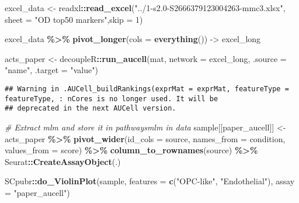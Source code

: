 \documentclass[
]{article}
\newenvironment{Shaded}{\begin{snugshade}}{\end{snugshade}}
\newcommand{\AttributeTok}[1]{\textcolor[rgb]{0.13,0.29,0.53}{#1}}
\newcommand{\CommentTok}[1]{\textcolor[rgb]{0.56,0.35,0.01}{\textit{#1}}}
\newcommand{\DecValTok}[1]{\textcolor[rgb]{0.00,0.00,0.81}{#1}}
\newcommand{\FunctionTok}[1]{\textcolor[rgb]{0.13,0.29,0.53}{\textbf{#1}}}
\newcommand{\NormalTok}[1]{#1}
\newcommand{\OtherTok}[1]{\textcolor[rgb]{0.56,0.35,0.01}{#1}}
\newcommand{\SpecialCharTok}[1]{\textcolor[rgb]{0.81,0.36,0.00}{\textbf{#1}}}
\newcommand{\StringTok}[1]{\textcolor[rgb]{0.31,0.60,0.02}{#1}}
\begin{document}
\begin{Shaded}
\begin{Highlighting}[]
\NormalTok{excel\_data }\OtherTok{\textless{}{-}}\NormalTok{ readxl}\SpecialCharTok{::}\FunctionTok{read\_excel}\NormalTok{(}\StringTok{"../1{-}s2.0{-}S2666379123004263{-}mmc3.xlsx"}\NormalTok{, }\AttributeTok{sheet =} \StringTok{"OD top50 markers"}\NormalTok{,}\AttributeTok{skip =} \DecValTok{1}\NormalTok{)}

\NormalTok{excel\_data }\SpecialCharTok{\%\textgreater{}\%} \FunctionTok{pivot\_longer}\NormalTok{(}\AttributeTok{cols =} \FunctionTok{everything}\NormalTok{()) }\OtherTok{{-}\textgreater{}}\NormalTok{ excel\_long}

\NormalTok{acts\_paper }\OtherTok{\textless{}{-}}\NormalTok{ decoupleR}\SpecialCharTok{::}\FunctionTok{run\_aucell}\NormalTok{(mat, }\AttributeTok{network =}\NormalTok{ excel\_long, }\AttributeTok{.source =} \StringTok{"name"}\NormalTok{, }\AttributeTok{.target =} \StringTok{"value"}\NormalTok{)}
\end{Highlighting}
\end{Shaded}

\begin{verbatim}
## Warning in .AUCell_buildRankings(exprMat = exprMat, featureType = featureType, : nCores is no longer used. It will be
## deprecated in the next AUCell version.
\end{verbatim}

\begin{Shaded}
\begin{Highlighting}[]
\CommentTok{\# Extract mlm and store it in pathwaysmlm in data}
\NormalTok{sample[[}\StringTok{\textquotesingle{}paper\_aucell\textquotesingle{}}\NormalTok{]] }\OtherTok{\textless{}{-}}\NormalTok{ acts\_paper }\SpecialCharTok{\%\textgreater{}\%}
  \FunctionTok{pivot\_wider}\NormalTok{(}\AttributeTok{id\_cols =} \StringTok{\textquotesingle{}source\textquotesingle{}}\NormalTok{, }\AttributeTok{names\_from =} \StringTok{\textquotesingle{}condition\textquotesingle{}}\NormalTok{,}
              \AttributeTok{values\_from =} \StringTok{\textquotesingle{}score\textquotesingle{}}\NormalTok{) }\SpecialCharTok{\%\textgreater{}\%}
  \FunctionTok{column\_to\_rownames}\NormalTok{(}\StringTok{\textquotesingle{}source\textquotesingle{}}\NormalTok{) }\SpecialCharTok{\%\textgreater{}\%}
\NormalTok{  Seurat}\SpecialCharTok{::}\FunctionTok{CreateAssayObject}\NormalTok{(.)}

\NormalTok{SCpubr}\SpecialCharTok{::}\FunctionTok{do\_ViolinPlot}\NormalTok{(sample, }\AttributeTok{features =} \FunctionTok{c}\NormalTok{(}\StringTok{"OPC{-}like"}\NormalTok{, }\StringTok{"Endothelial"}\NormalTok{), }\AttributeTok{assay =} \StringTok{"paper\_aucell"}\NormalTok{)}
\end{Highlighting}
\end{Shaded}
\end{document}
